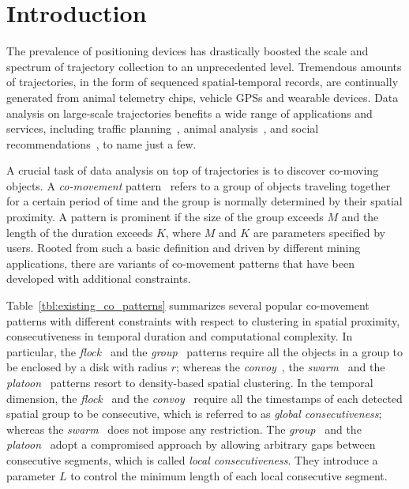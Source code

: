 
\section{Introduction}
The prevalence of positioning devices has drastically boosted 
the scale and spectrum of trajectory collection to an unprecedented level. 
Tremendous amounts of trajectories, in the form of sequenced spatial-temporal 
records, are continually generated from animal telemetry chips, 
vehicle GPSs and wearable devices. Data analysis on large-scale 
trajectories benefits a wide range of applications and services, 
including traffic planning~\cite{zheng2011urban}, animal analysis~\cite{li2010miningperiodic}, and social recommendations~\cite{bao2013survey}, to name just a few.

A crucial task of data analysis on top of trajectories is 
to discover co-moving objects. A \emph{co-movement} pattern~\cite{li2013managing,zheng2015survey} 
refers to a group of objects traveling together for a certain period of time 
and the group is normally determined by their spatial proximity. 
A pattern is prominent if the size of the group exceeds $M$ and the length of the duration exceeds $K$, where $M$ and $K$ are parameters specified by users. Rooted from such a basic definition 
and driven by different mining applications, there are  variants 
of co-movement patterns that have been developed with additional constraints.

Table~\ref{tbl:existing_co_patterns} summarizes several popular co-movement patterns 
with different constraints with respect to clustering in spatial proximity,
consecutiveness in temporal duration and computational complexity. 
In particular,  the \emph{flock}~\cite{gudmundsson2006flock} 
and the \emph{group}~\cite{wang2006grouppattern} patterns require 
all the objects in a group to be enclosed by a disk with radius $r$; 
whereas the \emph{convoy}~\cite{jeung2008convoy}, the \emph{swarm}~\cite{li2010swarm} 
and the \emph{platoon}~\cite{li2015platoon} patterns resort to density-based 
spatial clustering. 
In the temporal dimension, the \emph{flock}~\cite{gudmundsson2006flock} 
and the \emph{convoy}~\cite{jeung2008convoy} require all the timestamps 
of each detected spatial group to be consecutive, which is referred to as \emph{global consecutiveness}; 
whereas the \emph{swarm}~\cite{li2010swarm} does not impose any restriction. 
The \emph{group}~\cite{wang2006grouppattern} and the \emph{platoon}~\cite{li2015platoon} adopt a compromised approach by allowing
arbitrary gaps between consecutive segments, which is called \emph{local consecutiveness}. 
They introduce a parameter $L$ to control the minimum length of each local consecutive segment.

